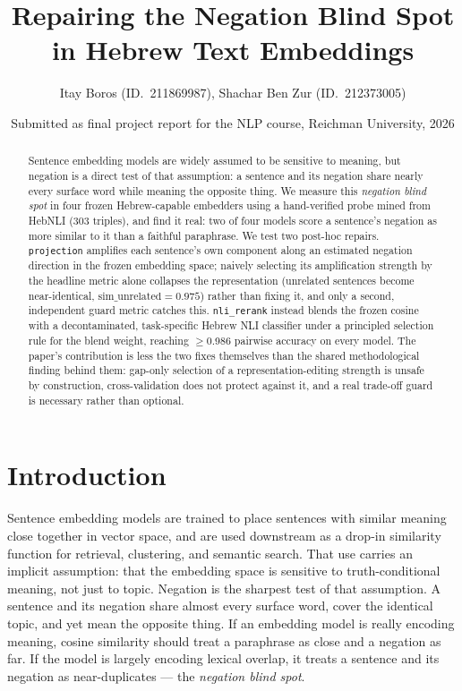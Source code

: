 \documentclass{article}
\title{Repairing the Negation Blind Spot in Hebrew Text Embeddings}
\author{Itay Boros (ID.\ 211869987), Shachar Ben Zur (ID.\ 212373005)}
\date{Submitted as final project report for the NLP course, Reichman University, 2026}
\begin{document}
\maketitle

\begin{abstract}
Sentence embedding models are widely assumed to be sensitive to meaning, but
negation is a direct test of that assumption: a sentence and its negation
share nearly every surface word while meaning the opposite thing. We
measure this \emph{negation blind spot} in four frozen Hebrew-capable
embedders using a hand-verified probe mined from HebNLI (303 triples), and
find it real: two of four models score a sentence's negation as more
similar to it than a faithful paraphrase. We test two post-hoc repairs.
\texttt{projection} amplifies each sentence's own component along an
estimated negation direction in the frozen embedding space; naively
selecting its amplification strength by the headline metric alone
collapses the representation (unrelated sentences become near-identical,
$\mathrm{sim\_unrelated}{=}0.975$) rather than fixing it, and only a
second, independent guard metric catches this. \texttt{nli\_rerank} instead
blends the frozen cosine with a decontaminated, task-specific Hebrew NLI
classifier under a principled selection rule for the blend weight, reaching
$\geq$0.986 pairwise accuracy on every model. The paper's contribution is
less the two fixes themselves than the shared methodological finding
behind them: gap-only selection of a representation-editing strength is
unsafe by construction, cross-validation does not protect against it, and
a real trade-off guard is necessary rather than optional.
\end{abstract}

\section{Introduction}

Sentence embedding models are trained to place sentences with similar
meaning close together in vector space, and are used downstream as a
drop-in similarity function for retrieval, clustering, and semantic search.
That use carries an implicit assumption: that the embedding space is
sensitive to truth-conditional meaning, not just to topic. Negation is the
sharpest test of that assumption. A sentence and its negation share almost
every surface word, cover the identical topic, and yet mean the opposite
thing. If an embedding model is really encoding meaning, cosine similarity
should treat a paraphrase as close and a negation as far. If the model is
largely encoding lexical overlap, it treats a sentence and its negation as
near-duplicates --- the \emph{negation blind spot}.
\end{document}
